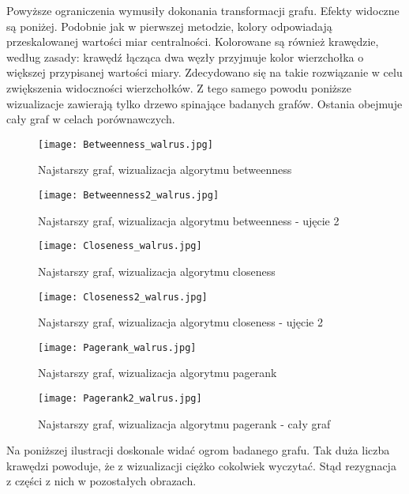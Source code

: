 Powyższe ograniczenia wymusiły dokonania transformacji grafu. Efekty widoczne są poniżej. Podobnie jak w pierwszej metodzie, kolory odpowiadają przeskalowanej wartości miar centralności. Kolorowane są również krawędzie, według zasady: krawędź łącząca dwa węzły przyjmuje kolor wierzchołka o większej przypisanej wartości miary. Zdecydowano się na takie rozwiązanie w celu zwiększenia widoczności wierzchołków. Z tego samego powodu poniższe wizualizacje zawierają tylko drzewo spinające badanych grafów. Ostania obejmuje cały graf w celach porównawczych. 

\FloatBarrier\FloatBarrier
\begin{figure}[h]
	\centering
	\texttt{[image: Betweenness\_walrus.jpg]}
	\caption{Najstarszy graf, wizualizacja algorytmu betweenness}
\end{figure}
\FloatBarrier\FloatBarrier
\FloatBarrier\FloatBarrier
\begin{figure}[h]
	\centering
	\texttt{[image: Betweenness2\_walrus.jpg]}
	\caption{Najstarszy graf, wizualizacja algorytmu betweenness - ujęcie 2}
\end{figure}
\FloatBarrier\FloatBarrier

\FloatBarrier\FloatBarrier
\begin{figure}[h]
	\centering
	\texttt{[image: Closeness\_walrus.jpg]}
	\caption{Najstarszy graf, wizualizacja algorytmu closeness}
\end{figure}
\FloatBarrier\FloatBarrier
\FloatBarrier\FloatBarrier
\begin{figure}[h]
	\centering
	\texttt{[image: Closeness2\_walrus.jpg]}
	\caption{Najstarszy graf, wizualizacja algorytmu closeness - ujęcie 2}
\end{figure}
\FloatBarrier\FloatBarrier        
\FloatBarrier\FloatBarrier
\begin{figure}[h]
	\centering
	\texttt{[image: Pagerank\_walrus.jpg]}
	\caption{Najstarszy graf, wizualizacja algorytmu pagerank}
\end{figure}
\FloatBarrier\FloatBarrier
\FloatBarrier\FloatBarrier
\begin{figure}[h]
	\centering
	\texttt{[image: Pagerank2\_walrus.jpg]}
	\caption{Najstarszy graf, wizualizacja algorytmu pagerank - cały graf}
\end{figure}
  

Na poniższej ilustracji doskonale widać ogrom badanego grafu. Tak duża liczba krawędzi powoduje, że z wizualizacji ciężko cokolwiek wyczytać. Stąd rezygnacja z części z nich w pozostałych obrazach.